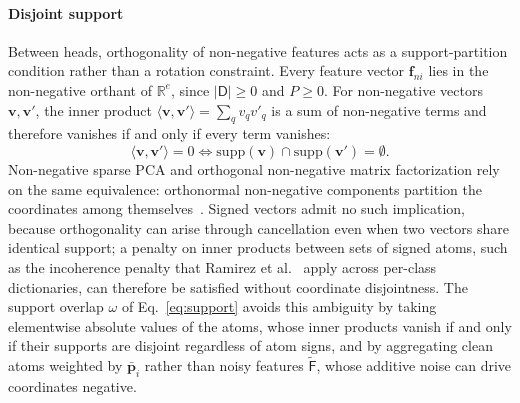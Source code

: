 \paragraph{Disjoint support}
\label{sec:disjoint}
Between heads, orthogonality of non-negative features acts as a
support-partition condition rather than a rotation constraint. Every
feature vector $\mathbf{f}_{ni}$ lies in the non-negative orthant of
$\mathbb{R}^e$, since $\lvert \mathsf{D} \rvert \geq 0$ and $P \geq 0$.
For non-negative vectors $\mathbf{v}, \mathbf{v}'$, the inner product
$\langle \mathbf{v},\mathbf{v}'\rangle = \sum_q v_q v'_q$ is a sum of
non-negative terms and therefore vanishes if and only if every term
vanishes:
\begin{equation}
	\langle \mathbf{v},\mathbf{v}'\rangle = 0
	\iff
	\mathrm{supp}(\mathbf{v}) \cap \mathrm{supp}(\mathbf{v}') = \emptyset.
	\label{eq:disjoint}
\end{equation}
Non-negative sparse PCA and orthogonal non-negative matrix factorization
rely on the same equivalence: orthonormal non-negative components
partition the coordinates among themselves~\cite{zass2006,asteris2015onmf}.
Signed vectors admit no such implication, because orthogonality can arise
through cancellation even when two vectors share identical support; a
penalty on inner products between sets of signed atoms, such as the
incoherence penalty that Ramirez et al.~\cite{ramirez2010} apply across
per-class dictionaries, can therefore be satisfied without coordinate
disjointness. The support overlap $\omega$ of Eq.~\eqref{eq:support}
avoids this ambiguity by taking elementwise absolute values of the atoms,
whose inner products vanish if and only if their supports are disjoint
regardless of atom signs, and by aggregating clean atoms weighted by
$\bar{\mathbf{p}}_i$ rather than noisy features $\tilde{\mathsf{F}}$,
whose additive noise can drive coordinates negative.

